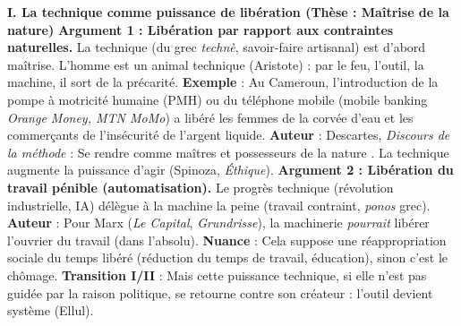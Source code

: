 \documentclass[11pt]{article}
\newcommand{\cle}[1]{{\popxbold\color{popdark}#1}}
\begin{document}
\begin{exoresolu}
    \textbf{I. La technique comme puissance de libération (Thèse : Maîtrise de la nature)}
    \textbf{Argument 1 : Libération par rapport aux contraintes naturelles.} La technique (du grec \emph{technè}, savoir-faire artisanal) est d'abord \cle{maîtrise}. \guillemotleft L'homme est un animal technique \guillemotright (Aristote) : par le feu, l'outil, la machine, il sort de la précarité. \textbf{Exemple} : Au Cameroun, l'introduction de la \cle{pompe à motricité humaine} (PMH) ou du \cle{téléphone mobile} (mobile banking \emph{Orange Money, MTN MoMo}) a libéré les femmes de la corvée d'eau et les commerçants de l'insécurité de l'argent liquide. \textbf{Auteur} : Descartes, \emph{Discours de la méthode} : \guillemotleft Se rendre comme maîtres et possesseurs de la nature \guillemotright. La technique augmente la \cle{puissance d'agir} (Spinoza, \emph{Éthique}).
    \textbf{Argument 2 : Libération du travail pénible (automatisation).} Le progrès technique (révolution industrielle, IA) délègue à la machine la \cle{peine} (travail contraint, \emph{ponos} grec). \textbf{Auteur} : Pour Marx (\emph{Le Capital}, \emph{Grundrisse}), la machinerie \emph{pourrait} libérer l'ouvrier du travail (dans l'absolu). \textbf{Nuance} : Cela suppose une \cle{réappropriation sociale} du temps libéré (réduction du temps de travail, éducation), sinon c'est le chômage.
    \textbf{Transition I/II} : Mais cette puissance technique, si elle n'est pas guidée par la raison politique, se retourne contre son créateur : l'outil devient \cle{système} (Ellul).


\end{exoresolu}
\end{document}
